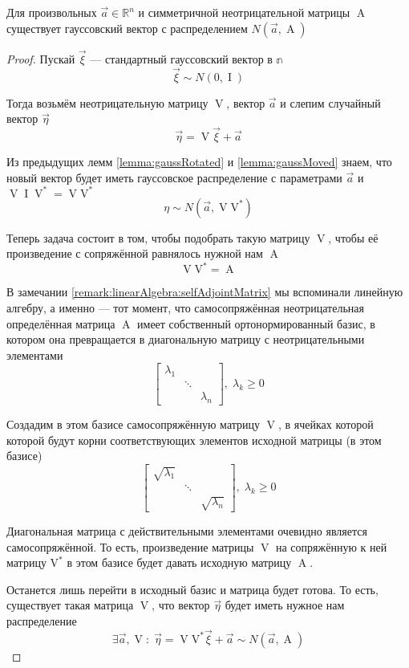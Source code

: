 \begin{theorem}\label{theorem:gaussianVectorExistance}
  Для произвольных $\vec{a} \in \mathbb{R}^n$ и симметричной неотрицательной
  матрицы $\operatorname{A}$ существует гауссовский вектор с распределением
  $N\left( \vec{a}, \operatorname{A} \right)$
\end{theorem}
\begin{proof}
  Пускай $\vec{\xi}$ --- стандартный гауссовский вектор в $\mathbb{n}$
  $$\vec{\xi} \sim N\left( 0, \operatorname{I} \right)$$

  Тогда возьмём неотрицательную матрицу $\operatorname{V}$, вектор $\vec{a}$ и
  слепим случайный вектор $\vec{\eta}$
  $$\vec{\eta} = \operatorname{V} \vec{\xi} + \vec{a}$$

  Из предыдущих лемм \ref{lemma:gaussRotated} и \ref{lemma:gaussMoved}
  знаем, что новый вектор будет иметь гауссовское распределение с параметрами
  $\vec{a}$ и $\operatorname{V} \operatorname{I} \operatorname{V}^* 
  = \operatorname{V} \operatorname{V^*} $
  $$\eta \sim N\left( \vec{a}, \operatorname{V} \operatorname{V^*} \right)$$

  Теперь задача состоит в том, чтобы подобрать такую матрицу $\operatorname{V}$,
  чтобы её произведение с сопряжённой равнялось нужной нам $\operatorname{A}$
  $$\operatorname{V} \operatorname{V^*} = \operatorname{A}$$

  В замечании \ref{remark:linearAlgebra:selfAdjointMatrix} мы вспоминали
  линейную алгебру, а именно --- тот момент, что самосопряжённая
  неотрицательная определённая матрица $\operatorname{A}$ имеет собственный
  ортонормированный базис, в котором она превращается в диагональную матрицу
  с неотрицательными элементами
  $$
  \begin{bmatrix}
      \lambda_1 & & \\
      & \ddots &  \\
      & & \lambda_n
  \end{bmatrix},\;
      \lambda_k \ge 0$$

  Создадим в этом базисе самосопряжённую матрицу $\operatorname{V}$, в ячейках
  которой которой будут корни соответствующих элементов исходной матрицы
  (в этом базисе)
  $$
  \begin{bmatrix}
      \sqrt{\lambda_1} & & \\
      & \ddots &  \\
      & & \sqrt{\lambda_n}
  \end{bmatrix},\; \lambda_k \ge 0$$

  Диагональная матрица с действительными элементами очевидно является
  самосопряжённой. То есть, произведение матрицы $\operatorname{V}$ на
  сопряжённую к ней матрицу $\operatorname{V^*}$ в этом базисе будет давать
  исходную матрицу $\operatorname{A}$.

  Останется лишь перейти в исходный базис и матрица будет готова. То есть,
  существует такая матрица $\operatorname{V}$, что вектор $\vec{\eta}$ будет
  иметь нужное нам распределение
  $$\exists \vec{a}, \operatorname{V}:\;
      \vec{\eta} = \operatorname{V} \operatorname{V^*} \vec{\xi} + \vec{a}
      \sim N\left( \vec{a}, \operatorname{A} \right)$$
\end{proof}

